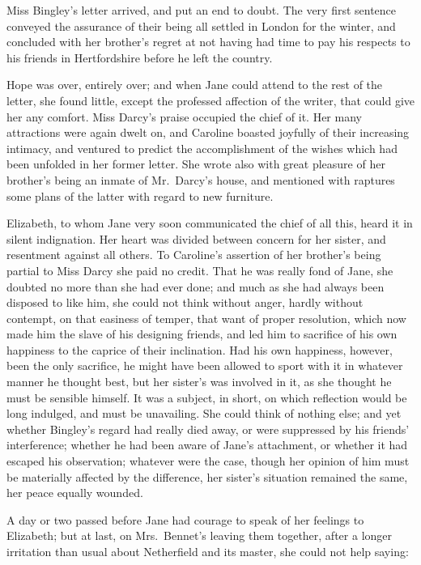 \documentclass[12pt,english]{book}
\begin{document}
Miss Bingley's letter arrived, and put an end to doubt. The very first
sentence conveyed the assurance of their being all settled in London
for the winter, and concluded with her brother's regret at not having
had time to pay his respects to his friends in Hertfordshire before
he left the country.

Hope was over, entirely over; and when Jane could attend to the rest
of the letter, she found little, except the professed affection of
the writer, that could give her any comfort. Miss Darcy's praise occupied
the chief of it. Her many attractions were again dwelt on, and Caroline
boasted joyfully of their increasing intimacy, and ventured to predict
the accomplishment of the wishes which had been unfolded in her former
letter. She wrote also with great pleasure of her brother's being
an inmate of Mr.\ Darcy's house, and mentioned with raptures some
plans of the latter with regard to new furniture.

Elizabeth, to whom Jane very soon communicated the chief of all this,
heard it in silent indignation. Her heart was divided between concern
for her sister, and resentment against all others. To Caroline's assertion
of her brother's being partial to Miss Darcy she paid no credit. That
he was really fond of Jane, she doubted no more than she had ever
done; and much as she had always been disposed to like him, she could
not think without anger, hardly without contempt, on that easiness
of temper, that want of proper resolution, which now made him the
slave of his designing friends, and led him to sacrifice of his own
happiness to the caprice of their inclination. Had his own happiness,
however, been the only sacrifice, he might have been allowed to sport
with it in whatever manner he thought best, but her sister's was involved
in it, as she thought he must be sensible himself. It was a subject,
in short, on which reflection would be long indulged, and must be
unavailing. She could think of nothing else; and yet whether Bingley's
regard had really died away, or were suppressed by his friends' interference;
whether he had been aware of Jane's attachment, or whether it had
escaped his observation; whatever were the case, though her opinion
of him must be materially affected by the difference, her sister's
situation remained the same, her peace equally wounded.

A day or two passed before Jane had courage to speak of her feelings
to Elizabeth; but at last, on Mrs.\ Bennet's leaving them together,
after a longer irritation than usual about Netherfield and its master,
she could not help saying:
\end{document}
